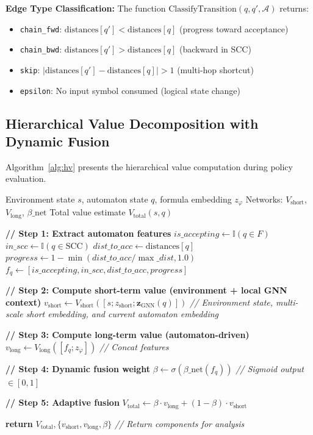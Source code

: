 \documentclass[journal]{IEEEtran}
\begin{document}
	\textbf{Edge Type Classification:} The function $\text{ClassifyTransition}(q, q', \mathcal{A})$ returns:
\begin{itemize}
\item \texttt{chain\_fwd}: $\text{distances}[q'] < \text{distances}[q]$ (progress toward acceptance)
\item \texttt{chain\_bwd}: $\text{distances}[q'] > \text{distances}[q]$ (backward in SCC)
\item \texttt{skip}: $|\text{distances}[q'] - \text{distances}[q]| > 1$ (multi-hop shortcut)
\item \texttt{epsilon}: No input symbol consumed (logical state change)
\end{itemize}

\subsection{Hierarchical Value Decomposition with Dynamic Fusion}

Algorithm~\ref{alg:hv} presents the hierarchical value computation during policy evaluation.

\begin{algorithm}[h]
\caption{Hierarchical Value Estimation}
\label{alg:hv}
\begin{algorithmic}[1]
\REQUIRE Environment state $s$, automaton state $q$, formula embedding $z_\varphi$
\REQUIRE Networks: $V_{\text{short}}$, $V_{\text{long}}$, $\beta\_\text{net}$
\ENSURE Total value estimate $V_{\text{total}}(s, q)$

\STATE \textbf{// Step 1: Extract automaton features}
\STATE $is\_accepting \gets \mathbb{I}(q \in F)$
\STATE $in\_scc \gets \mathbb{I}(q \in \text{SCC})$
\STATE $dist\_to\_acc \gets \text{distances}[q]$
\STATE $progress \gets 1 - \min(dist\_to\_acc / \max\_dist, 1.0)$
\STATE $f_q \gets [is\_accepting, in\_scc, dist\_to\_acc, progress]$

\STATE \textbf{// Step 2: Compute short-term value (environment + local GNN context)}
\STATE $v_{\text{short}} \gets V_{\text{short}}([s; z_{\text{short}}; \mathbf{z}_{\text{GNN}}(q)])$ \hfill \textit{// Environment state, multi-scale short embedding, and current automaton embedding}

\STATE \textbf{// Step 3: Compute long-term value (automaton-driven)}
\STATE $v_{\text{long}} \gets V_{\text{long}}([f_q; z_\varphi])$ \hfill \textit{// Concat features}

\STATE \textbf{// Step 4: Dynamic fusion weight}
\STATE $\beta \gets \sigma(\beta\_\text{net}(f_q))$ \hfill \textit{// Sigmoid output $\in [0, 1]$}

\STATE \textbf{// Step 5: Adaptive fusion}
\STATE $V_{\text{total}} \gets \beta \cdot v_{\text{long}} + (1 - \beta) \cdot v_{\text{short}}$

\STATE \textbf{return} $V_{\text{total}}, \{v_{\text{short}}, v_{\text{long}}, \beta\}$ \hfill \textit{// Return components for analysis}
\end{algorithmic}
\end{algorithm}
\end{document}
